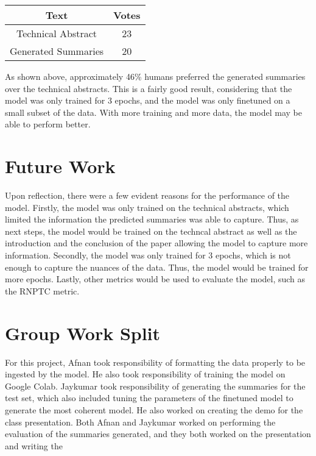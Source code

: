 \documentclass[11pt,a4paper]{article}
\begin{document}
\begin{table}[!htbp]
  \begin{tabular}{|c | c|} 
   \hline
   Text & Votes \\ [1ex] 
   \hline\hline
   Technical Abstract & 23 \\ [1ex]
   \hline
   Generated Summaries & 20 \\ [1ex]
   \hline
  \end{tabular}
\end{table}


\indent \indent As shown above, approximately 46\% humans preferred the generated summaries over the technical abstracts. This is a fairly good result, considering that the model was only trained for 3 epochs, and the model was only finetuned on a small subset of the data. With more training and more data, the model may be able to perform better.

\section{Future Work}

\indent \indent Upon reflection, there were a few evident reasons for the performance of the model. Firstly, the model was only trained on the technical abstracts, which limited the information the predicted summaries was able to capture. Thus, as next steps, the model would be trained on the techncal abstract as well as the introduction and the conclusion of the paper allowing the model to capture more information. Secondly, the model was only trained for 3 epochs, which is not enough to capture the nuances of the data. Thus, the model would be trained for more epochs. Lastly, other metrics would be used to evaluate the model, such as the RNPTC metric.

\vspace{5.5cm}




\appendix

\section{Group Work Split}
For this project, Afnan took responsibility of formatting the data properly to be ingested by the model. He also took responsibility of training the model on Google Colab. Jaykumar took responsibility of generating the summaries for the test set, which also included tuning the parameters of the finetuned model to generate the most coherent model. He also worked on creating the demo for the class presentation. Both Afnan and Jaykumar worked on performing the evaluation of the summaries generated, and they both worked on the presentation and writing the
\end{document}
